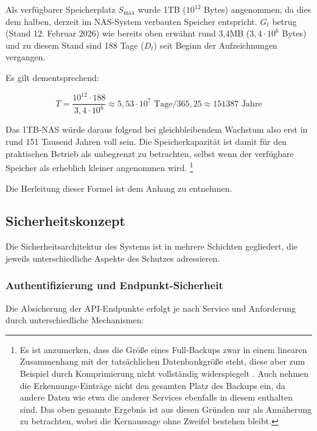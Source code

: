 Als verfügbarer Speicherplatz $S_{\max}$ wurde 1TB ($10^{12}$ Bytes) angenommen, da dies dem halben, derzeit im NAS-System verbauten Speicher entspricht.
$G_t$ betrug (Stand 12. Februar 2026) wie bereits oben erwähnt rund 3,4MB ($3{,}4 \cdot 10^{6}$ Bytes) und zu diesem Stand sind 188 Tage ($D_t$) seit Beginn der Aufzeichnungen vergangen.

Es gilt dementsprechend:

\begin{equation}
    T = \frac{10^{12} \cdot 188}{3{,}4 \cdot 10^6} \approx 5{,}53 \cdot 10^{7} \text{ Tage} / 365{,}25 \approx 151387 \text{ Jahre}
\end{equation}

Das 1TB-NAS würde daraus folgend bei gleichbleibendem Wachstum also erst in rund 151 Tausend Jahren voll sein.
Die Speicherkapazität ist damit für den praktischen Betrieb als unbegrenzt zu betrachten, selbst wenn der verfügbare Speicher als erheblich kleiner angenommen wird.
\footnote{Es ist anzumerken, dass die Größe eines Full-Backups zwar in einem linearen Zusammenhang mit der tatsächlichen Datenbankgröße steht, diese aber zum Beispiel durch Komprimierung nicht vollständig widerspiegelt \cite{so_backup_size, sqlskills_backup}.
    Auch nehmen die Erkennungs-Einträge nicht den gesamten Platz des Backups ein, da andere Daten wie etwa die anderer Services ebenfalls in diesem enthalten sind.
    Das oben genannte Ergebnis ist aus diesen Gründen nur als Annäherung zu betrachten, wobei die Kernaussage ohne Zweifel bestehen bleibt.}

Die Herleitung dieser Formel ist dem Anhang zu entnehmen.

\newpage
\subsection{Sicherheitskonzept}
\label{sec:sicherheitskonzept}

Die Sicherheitsarchitektur des Systems ist in mehrere Schichten gegliedert, die jeweils unterschiedliche Aspekte des Schutzes adressieren.


\subsubsection{Authentifizierung und Endpunkt-Sicherheit}

Die Absicherung der API-Endpunkte erfolgt je nach Service und Anforderung durch unterschiedliche Mechanismen:

